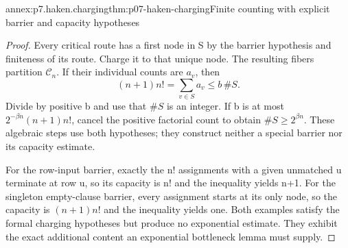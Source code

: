 \begin{annexitem}{annex:p7.haken.charging}{thm:p07-haken-charging}{Finite counting with explicit barrier and capacity hypotheses}
\begin{proof}
Every critical route has a first node in S by the barrier
hypothesis and finiteness of its route. Charge it to that
unique node. The resulting fibers partition \(\mathcal C_n\).
If their individual counts are \(a_v\), then
\[
 (n+1)n!=\sum_{v\in S}a_v\leq b\,\#S.
\]
Divide by positive b and use that \(\#S\) is an integer.
If b is at most \(2^{-\beta n}(n+1)n!\), cancel the
positive factorial count to obtain \(\#S\geq2^{\beta n}\).
These algebraic steps use both hypotheses; they construct
neither a special barrier nor its capacity estimate.

For the row-input barrier, exactly the n! assignments with a
given unmatched u terminate at row u, so its capacity is n!
and the inequality yields n+1. For the singleton empty-clause
barrier, every assignment starts at its only node, so the
capacity is \((n+1)n!\) and the inequality yields one.
Both examples satisfy the formal charging hypotheses but
produce no exponential estimate. They exhibit the exact
additional content an exponential bottleneck lemma must supply.
\end{proof}
\end{annexitem}

